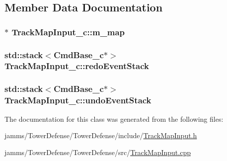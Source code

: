 \subsection{Member Data Documentation}
\hypertarget{class_track_map_input__c_ac97a1987b2dbb6826e5bf5c8ef3e4283}{
\subsubsection[{m\+\_\+map}]{$\ast$ Track\+Map\+Input\+\_\+c\+::m\+\_\+map\hspace{0.3cm}{\ttfamily [private]}}}\label{class_track_map_input__c_ac97a1987b2dbb6826e5bf5c8ef3e4283}
\hypertarget{class_track_map_input__c_adbb2c952b62701ddbf835979484e38b3}{
\subsubsection[{redo\+Event\+Stack}]{\setlength{\rightskip}{0pt plus 5cm}std\+::stack$<${\bf Cmd\+Base\+\_\+c}$\ast$$>$ Track\+Map\+Input\+\_\+c\+::redo\+Event\+Stack\hspace{0.3cm}{\ttfamily [private]}}}\label{class_track_map_input__c_adbb2c952b62701ddbf835979484e38b3}
\hypertarget{class_track_map_input__c_af8132fe4139361e7ff0e06b2ed19eb4d}{
\subsubsection[{undo\+Event\+Stack}]{\setlength{\rightskip}{0pt plus 5cm}std\+::stack$<${\bf Cmd\+Base\+\_\+c}$\ast$$>$ Track\+Map\+Input\+\_\+c\+::undo\+Event\+Stack\hspace{0.3cm}{\ttfamily [private]}}}\label{class_track_map_input__c_af8132fe4139361e7ff0e06b2ed19eb4d}


The documentation for this class was generated from the following files\+:\begin{DoxyCompactItemize}
\item 
jamms/\+Tower\+Defense/\+Tower\+Defense/include/\hyperlink{_track_map_input_8h}{Track\+Map\+Input.\+h}\item 
jamms/\+Tower\+Defense/\+Tower\+Defense/src/\hyperlink{src_2_track_map_input_8cpp}{Track\+Map\+Input.\+cpp}\end{DoxyCompactItemize}

